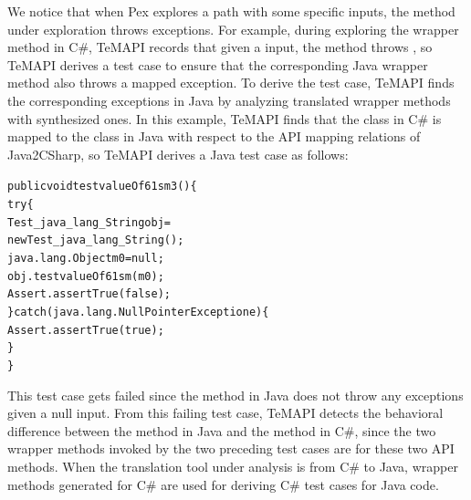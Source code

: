 We notice that when Pex explores a path with some specific inputs, the method under exploration throws exceptions.
For example, during exploring the  wrapper method in C\#, TeMAPI records that given a  input, the method throws , so TeMAPI derives a test case to ensure that the corresponding Java wrapper method also throws a mapped exception. To derive the test case, TeMAPI finds the corresponding exceptions in Java by analyzing translated wrapper methods with synthesized ones. In this example, TeMAPI finds that the  class in C\# is mapped to the  class in Java with respect to the API mapping relations of Java2CSharp, so TeMAPI derives a Java test case as follows:

\begin{CodeOut}\vspace*{-1.5ex}
\begin{alltt}
 public void testvalueOf61sm3()\{
   try\{
     Test_java_lang_String obj =
           new Test_java_lang_String();
     java.lang.Object m0 = null;
     obj.testvalueOf61sm(m0);
     Assert.assertTrue(false);
   \}catch(java.lang.NullPointerException e)\{
     Assert.assertTrue(true);
   \}
 \}
\end{alltt}
\end{CodeOut}\vspace*{-1ex}

This test case gets failed since the  method in Java does not throw any exceptions given a null input.
From this failing test case, TeMAPI detects the behavioral difference between the  method in Java and the  method in C\#, since the two wrapper methods invoked by the two preceding test cases are for these two API methods. When the translation tool under analysis is from C\# to Java, wrapper methods generated for C\# are used for deriving C\# test cases for Java code.

\label{sec:approach:sequence}

